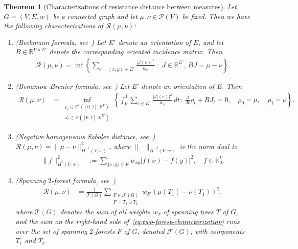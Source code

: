 \documentclass[11pt,a4paper]{article}
\newcommand{\Resis}{\mathcal{R}}
\newcommand{\Tree}{\mathcal{T}}
\newcommand{\Forest}{\mathcal{F}}
\newcommand{\Prob}{\mathscr{P}}
\newtheorem{theorem}{Theorem}[section]
\begin{document}
\begin{theorem}[Characterizations of resistance distance between measures]\label{thm:characterizations}
    Let $G=(V,E, w)$ be a connected graph and let $\mu,\nu\in\Prob(V)$ be fixed. Then we have the following characterizations of $\Resis (\mu,\nu)$:
        \begin{enumerate}
            \item \emph{(Beckmann formula, see~)} Let $E'$ denote an orientation of $E$, and let $B\in\mathbb{R}^{V\times E'}$ denote the corresponding oriented incidence matrix. Then
                \begin{align*}
                    \Resis (\mu,\nu) = \inf\left\{\sum_{e=(x,y)\in E'} \frac{|J(e)|^2}{w_e} \;:\; J\in\mathbb{R}^{E'},\, BJ = \mu-\nu\right\}.
                \end{align*}

            \item \emph{(Benamou--Brenier formula, see~)} Let $E'$ denote an orientation of $E$. Then
                \begin{align*}
                    \Resis (\mu,\nu) &= \inf_{\substack{\rho_t\in \mathcal{C}^1([0,1]; \mathbb{R}^{V})\\ J_t\in \mathcal{B}([0,1]; \mathbb{R}^{E'})}} \left\{\int_0^1 \sum_{e\in E'} \frac{|J_t(e)|^2}{w_e} \, dt \,:\, \frac{d}{dt} \rho_t + B J_t = 0,\quad \rho_0 = \mu,\quad \rho_1 = \nu\right\}.
                \end{align*}

            \item \emph{(Negative homogeneous Sobolev distance, see~)}  $\Resis (\mu,\nu) = \|\mu-\nu\|_{\dot{H}^{-1}(V,w)}^2$, where $\|\cdot\|_{\dot{H}^{-1}(V,w)}$ is the norm dual to
                \begin{align*}
                    \|f\|_{\dot{H}^{1}(V,w)}^{2} &:= \sum_{\{x,y\}\in E} w_{xy} |f(x)-f(y)|^2 ,\quad f\in \mathbb{R}^{V}_0.
                \end{align*}
    
            \item \emph{(Spanning $2$-forest formula, see~)} 
                \begin{align}\label{eq:two-forest-characterization}
                    \Resis (\mu,\nu) &= \frac{1}{\Tree (G)}\sum_{\substack{F\in\Forest (G) \\ F=T_1\cup T_2}} w_F \, (\mu(T_1)-\nu(T_1))^2,
                \end{align}
            where $\Tree(G)$ denotes the sum of all weights $w_T$ of spanning trees $T$ of $G$, and the sum on the right-hand side of~\cref{eq:two-forest-characterization} runs over the set of spanning $2$-forests $F$ of $G$, denoted $\Forest (G)$, with components $T_1$ and $T_2$.


\end{enumerate}
\end{theorem}
\end{document}
